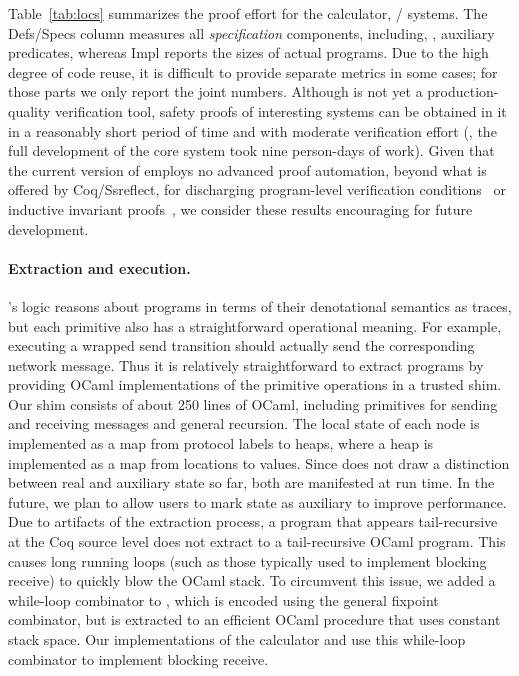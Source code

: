%
Table~\ref{tab:locs} summarizes the proof effort for the calculator,
/ systems.
%
The \textsf{Defs/Specs} column measures all \emph{specification}
components, including, \eg, auxiliary predicates, whereas
\textsf{Impl} reports the sizes of actual \disel programs.
%
Due to the high degree of code reuse, it is difficult to provide
separate metrics in some cases; for those parts we only report the
joint numbers.
%
Although \disel is not yet a production-quality verification tool,
safety proofs of interesting systems can be obtained in it in a
reasonably short period of time and with moderate verification effort
(\eg, the full development of the core  system took nine
person-days of work).
%
Given that the current version of \disel employs no advanced proof
automation, beyond what is offered by Coq/Ssreflect, for discharging
program-level verification conditions~\cite{chlipala:bedrock} or
inductive invariant proofs~\cite{Padon-al:PLDI16}, we consider these
results encouraging for future development.

\paragraph{Extraction and execution.~}
\label{sec:extracting-runtime}

\disel's logic reasons about programs in terms of their denotational
semantics as traces, but each primitive also has a
straightforward operational meaning.
%
For example, executing a wrapped send transition should actually send
the corresponding network message.
%
Thus it is relatively straightforward to extract \disel programs by
providing OCaml implementations of the primitive operations in a
trusted shim.
%
Our shim consists of about 250 lines of OCaml, including primitives
for sending and receiving messages and general recursion.
%
The local state of each node is implemented as a map from protocol
labels to heaps, where a heap is implemented as a map from locations
to values.
%
Since \disel does not draw a distinction between real and auxiliary
state so far, both are manifested at run time.
%
In the future, we plan to allow users to mark state as auxiliary to
improve performance.
%
Due to artifacts of the extraction process, a \disel program that
appears tail-recursive at the Coq source level does not extract to a
tail-recursive OCaml program.
%
This causes long running loops (such as those typically used to
implement blocking receive) to quickly blow the OCaml stack.
%
To circumvent this issue, we added a while-loop combinator to \disel,
which is encoded using the general fixpoint combinator, but is extracted to
an efficient OCaml procedure that uses constant stack space.
%
Our implementations of the calculator and  use this
while-loop combinator to implement blocking receive.
%

